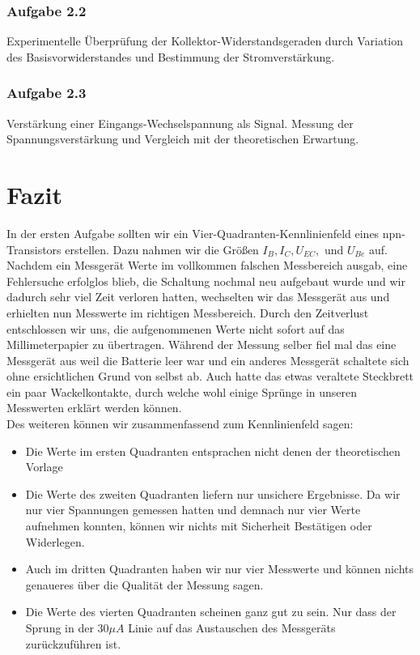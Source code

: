 \documentclass{article}
\begin{document}
\subsubsection*{Aufgabe 2.2}
Experimentelle Überprüfung der Kollektor-Widerstandsgeraden durch Variation des
Basisvorwiderstandes und Bestimmung der Stromverstärkung.
\subsubsection*{Aufgabe 2.3}
Verstärkung einer Eingangs-Wechselspannung als Signal. Messung der Spannungsverstärkung und Vergleich mit der theoretischen Erwartung.

\newpage





\newpage
\section{Fazit}
In der ersten Aufgabe sollten wir ein Vier-Quadranten-Kennlinienfeld eines npn-Transistors erstellen. Dazu nahmen wir die Größen \(I_B, I_C, U_{EC},\) und \(U_{Be}\) auf. Nachdem ein Messgerät Werte im vollkommen falschen Messbereich ausgab, eine Fehlersuche erfolglos blieb, die Schaltung nochmal neu aufgebaut wurde und wir dadurch sehr viel Zeit verloren hatten, wechselten wir das Messgerät aus und erhielten nun Messwerte im richtigen Messbereich. Durch den Zeitverlust entschlossen wir uns, die aufgenommenen Werte nicht sofort auf das Millimeterpapier zu übertragen. Während der Messung selber fiel mal das eine Messgerät aus weil die Batterie leer war und ein anderes Messgerät schaltete sich ohne ersichtlichen Grund von selbst ab. Auch hatte das etwas veraltete Steckbrett ein paar Wackelkontakte, durch welche wohl einige Sprünge in unseren Messwerten erklärt werden können.\\
Des weiteren können wir zusammenfassend zum Kennlinienfeld sagen:
\begin{itemize}
\item Die Werte im ersten Quadranten entsprachen nicht denen der theoretischen Vorlage
\item Die Werte des zweiten Quadranten liefern nur unsichere Ergebnisse. Da wir nur vier Spannungen gemessen hatten und demnach nur vier Werte aufnehmen konnten, können wir nichts mit Sicherheit Bestätigen oder Widerlegen.
\item Auch im dritten Quadranten haben wir nur vier Messwerte und können nichts genaueres über die Qualität der Messung sagen.
\item Die Werte des vierten Quadranten scheinen ganz gut zu sein. Nur dass der Sprung in der 30\(\mu A\) Linie auf das Austauschen des Messgeräts zurückzuführen ist.
\end{itemize}
\end{document}
